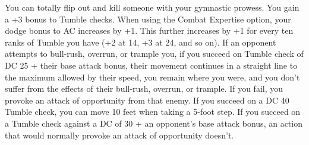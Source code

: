{You can totally flip out and kill someone with your gymnastic prowess.}
{You gain a +3 bonus to Tumble checks.}
{When using the Combat Expertise option, your dodge bonus to AC increases by +1. This further increases by +1 for every ten ranks of Tumble you have (+2 at 14, +3 at 24, and so on).}
{If an opponent attempts to bull-rush, overrun, or trample you, if you succeed on Tumble check of DC 25 + their base attack bonus, their movement continues in a straight line to the maximum allowed by their speed, you remain where you were, and you don't suffer from the effects of their bull-rush, overrun, or trample. If you fail, you provoke an attack of opportunity from that enemy.}
{If you succeed on a DC 40 Tumble check, you can move 10 feet when taking a 5-foot step.}
{If you succeed on a Tumble check against a DC of 30 + an opponent's base attack bonus, an action that would normally provoke an attack of opportunity doesn't.}